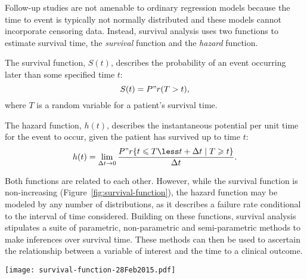 Follow-up studies are not amenable to ordinary regression models because the
time to event is typically not normally distributed and these models cannot
incorporate censoring data.  Instead, survival analysis uses two functions to
estimate survival time, the \emph{survival} function and the \emph{hazard}
function.

The survival function, $S(t)$, describes the probability of an event occurring
later than some specified time $t$:
\begin{equation}
  \label{eq:survival-function}
  S(t) = P"r(T > t),
\end{equation}
where $T$ is a random variable for a patient's survival time.

The hazard function, $h(t)$, describes the instantaneous potential per unit time
for the event to occur, given the patient has survived up to time $t$:
\begin{equation}
  \label{eq:hazard-function}
  h(t) = \lim_{\Delta t \to 0}\frac{P"r\{t \leqslant T \less t + \Delta t
    \mid T \geqslant t \}}{\Delta t}.
\end{equation}


Both functions are related to each other.  However, while the survival function
is non-increasing (Figure~\ref{fig:survival-function}), the hazard function may
be modeled by any number of distributions, as it describes a failure rate
conditional to the interval of time considered.  Building on these functions,
survival analysis stipulates a suite of parametric, non-parametric and
semi-parametric methods to make inferences over survival time.  These methods
can then be used to ascertain the relationship between a variable of interest
and the time to a clinical outcome.

\begin{marginfigure}%
  \texttt{[image: survival-function-28Feb2015.pdf]}
  \caption[Survival function]{The survival function, $S(t)$ describes the
    likelihood that a patient will have a lifetime exceeding time $t$.
    \textbf{A:}~The theoretical distribution is non-increasing, and
    characterized by $S(0)=1$ and $S(\infty)=0$.  \textbf{B:}~In practice, the
    estimated survival function, $\hat{S}(t)$, often takes the shape of a step
    function.  Because study periods are never infinite and there may be
    competing risks for failure, it is likely that not all patients will
    experience a clinical outcome by the end of the
    study.}\label{fig:survival-function}%
\end{marginfigure}

